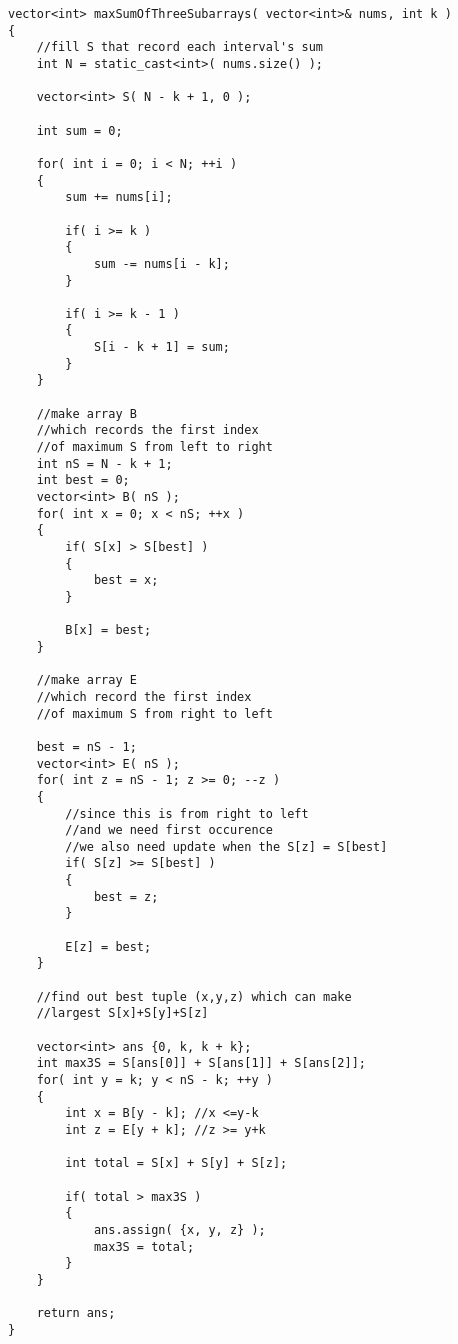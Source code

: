 \setcounter{lstlisting}{0}
\begin{lstlisting}[style=customc, caption={Dynamic Programming}]
vector<int> maxSumOfThreeSubarrays( vector<int>& nums, int k )
{
    //fill S that record each interval's sum
    int N = static_cast<int>( nums.size() );

    vector<int> S( N - k + 1, 0 );

    int sum = 0;

    for( int i = 0; i < N; ++i )
    {
        sum += nums[i];

        if( i >= k )
        {
            sum -= nums[i - k];
        }

        if( i >= k - 1 )
        {
            S[i - k + 1] = sum;
        }
    }

    //make array B
    //which records the first index
    //of maximum S from left to right
    int nS = N - k + 1;
    int best = 0;
    vector<int> B( nS );
    for( int x = 0; x < nS; ++x )
    {
        if( S[x] > S[best] )
        {
            best = x;
        }

        B[x] = best;
    }

    //make array E
    //which record the first index
    //of maximum S from right to left

    best = nS - 1;
    vector<int> E( nS );
    for( int z = nS - 1; z >= 0; --z )
    {
        //since this is from right to left
        //and we need first occurence
        //we also need update when the S[z] = S[best]
        if( S[z] >= S[best] )
        {
            best = z;
        }

        E[z] = best;
    }

    //find out best tuple (x,y,z) which can make
    //largest S[x]+S[y]+S[z]

    vector<int> ans {0, k, k + k};
    int max3S = S[ans[0]] + S[ans[1]] + S[ans[2]];
    for( int y = k; y < nS - k; ++y )
    {
        int x = B[y - k]; //x <=y-k
        int z = E[y + k]; //z >= y+k

        int total = S[x] + S[y] + S[z];

        if( total > max3S )
        {
            ans.assign( {x, y, z} );
            max3S = total;
        }
    }

    return ans;
}
\end{lstlisting}